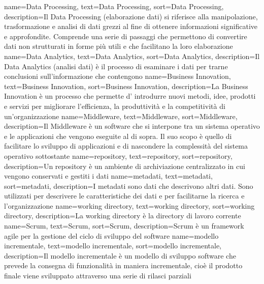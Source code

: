 {
    name={Data Processing},
    text=Data Processing,
    sort=Data Processing,
    description={Il Data Processing (elaborazione dati) si riferisce alla manipolazione, trasformazione e analisi di dati grezzi al fine di ottenere informazioni significative e approfondite. Comprende una serie di passaggi che permettono di convertire dati non strutturati in forme più utili e che facilitano la loro elaborazione}
}
{
    name={Data Analytics},
    text=Data Analytics,
    sort=Data Analytics,
    description={Il Data Analytics (analisi dati) è il processo di esaminare i dati per trarne conclusioni sull'informazione che contengono}
}
{
    name={Business Innovation},
    text=Business Innovation,
    sort=Business Innovation,
    description={La Business Innovation è un processo che permette d' introdurre nuovi metodi, idee, prodotti e servizi per migliorare l'efficienza, la produttività e la competitività di un'organizzazione}
}
{
    name={Middleware},
    text=Middleware,
    sort=Middleware,
    description={Il Middleware è un software che si interpone tra un sistema operativo e le applicazioni che vengono eseguite al di sopra. Il suo scopo è quello di facilitare lo sviluppo di applicazioni e di nascondere la complessità del sistema operativo sottostante}
}
{
    name={repository},
    text=repository,
    sort=repository,
    description={Un repository è un ambiente di archiviazione centralizzato in cui vengono conservati e gestiti i dati}
}
{
    name={metadati},
    text=metadati,
    sort=metadati,
    description={I metadati sono dati che descrivono altri dati. Sono utilizzati per descrivere le caratteristiche dei dati e per facilitarne la ricerca e l'organizzazione}
}
{
    name={working directory},
    text=working directory,
    sort=working directory,
    description={La working directory è la directory di lavoro corrente}
}
{
    name={Scrum},
    text=Scrum,
    sort=Scrum,
    description={Scrum è un framework agile per la gestione del ciclo di sviluppo del software}
}
{
    name={modello incrementale},
    text=modello incrementale,
    sort=modello incrementale,
    description={Il modello incrementale è un modello di sviluppo software che prevede la consegna di funzionalità in maniera incrementale, cioè il prodotto finale viene 
    sviluppato attraverso una serie di rilasci parziali}
}
